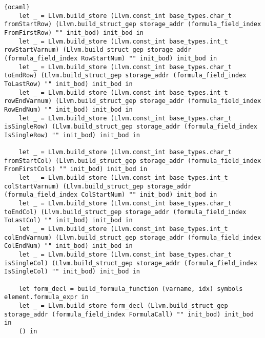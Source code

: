 \begin{lstlisting}{ocaml}
    let _ = Llvm.build_store (Llvm.const_int base_types.char_t fromStartRow) (Llvm.build_struct_gep storage_addr (formula_field_index FromFirstRow) "" init_bod) init_bod in
    let _ = Llvm.build_store (Llvm.const_int base_types.int_t rowStartVarnum) (Llvm.build_struct_gep storage_addr (formula_field_index RowStartNum) "" init_bod) init_bod in
    let _ = Llvm.build_store (Llvm.const_int base_types.char_t toEndRow) (Llvm.build_struct_gep storage_addr (formula_field_index ToLastRow) "" init_bod) init_bod in
    let _ = Llvm.build_store (Llvm.const_int base_types.int_t rowEndVarnum) (Llvm.build_struct_gep storage_addr (formula_field_index RowEndNum) "" init_bod) init_bod in
    let _ = Llvm.build_store (Llvm.const_int base_types.char_t isSingleRow) (Llvm.build_struct_gep storage_addr (formula_field_index IsSingleRow) "" init_bod) init_bod in

    let _ = Llvm.build_store (Llvm.const_int base_types.char_t fromStartCol) (Llvm.build_struct_gep storage_addr (formula_field_index FromFirstCols) "" init_bod) init_bod in
    let _ = Llvm.build_store (Llvm.const_int base_types.int_t colStartVarnum) (Llvm.build_struct_gep storage_addr (formula_field_index ColStartNum) "" init_bod) init_bod in
    let _ = Llvm.build_store (Llvm.const_int base_types.char_t toEndCol) (Llvm.build_struct_gep storage_addr (formula_field_index ToLastCol) "" init_bod) init_bod in
    let _ = Llvm.build_store (Llvm.const_int base_types.int_t colEndVarnum) (Llvm.build_struct_gep storage_addr (formula_field_index ColEndNum) "" init_bod) init_bod in
    let _ = Llvm.build_store (Llvm.const_int base_types.char_t isSingleCol) (Llvm.build_struct_gep storage_addr (formula_field_index IsSingleCol) "" init_bod) init_bod in

    let form_decl = build_formula_function (varname, idx) symbols element.formula_expr in
    let _ = Llvm.build_store form_decl (Llvm.build_struct_gep storage_addr (formula_field_index FormulaCall) "" init_bod) init_bod in
    () in


\end{lstlisting}
